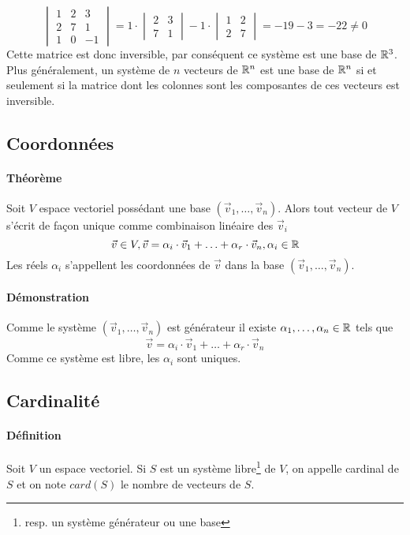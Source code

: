 $$\begin{vmatrix}
  1 & 2 & 3 \\
  2 & 7 & 1 \\
  1 & 0 & -1
\end{vmatrix}
=
1 \cdot 
\begin{vmatrix}
  2 & 3 \\
  7 & 1
\end{vmatrix}
-1 \cdot
\begin{vmatrix}
  1 & 2 \\
  2 & 7
\end{vmatrix}
= -19 -3 = -22 \neq 0$$
Cette matrice est donc inversible, par conséquent ce système est une base de $\mathbb{R}^3$. \\
Plus généralement, un système de $n$ vecteurs de $\mathbb{R}^n$ est une base de $\mathbb{R}^n$ si et seulement si la matrice dont les colonnes sont les composantes de ces vecteurs est inversible.

%
\subsection{Coordonnées}
%
\paragraph{Théorème} Soit $V$ espace vectoriel possédant une base $(\vec{v}_1, \ldots, \vec{v}_n)$. Alors tout vecteur de $V$ s'écrit de façon unique comme combinaison linéaire des $\vec{v}_i$
$$\vec{v} \in V, \vec{v}=\alpha_i \cdot \vec{v}_1 + \ldots + \alpha_r \cdot \vec{v}_n, \alpha_i \in \mathbb{R}$$
Les réels $\alpha_i$ s'appellent les coordonnées de $\vec{v}$ dans la base $(\vec{v}_1, \ldots, \vec{v}_n)$.

\paragraph{Démonstration} Comme le système $(\vec{v}_1, \ldots, \vec{v}_n)$ est générateur il existe  $\alpha_1, \ldots, \alpha_n \in \mathbb{R}$ tels que 
$$\vec{v}=\alpha_i \cdot \vec{v}_1 + \ldots + \alpha_r \cdot \vec{v}_n$$
Comme ce système est libre, les $\alpha_i$ sont uniques.

%
\subsection{Cardinalité}
%
\paragraph{Définition} Soit $V$ un espace vectoriel. Si $S$ est un système libre\footnote{resp. un système générateur ou une base} de $V$, on appelle cardinal de $S$ et on note $card(S)$ le nombre de vecteurs de $S$.

